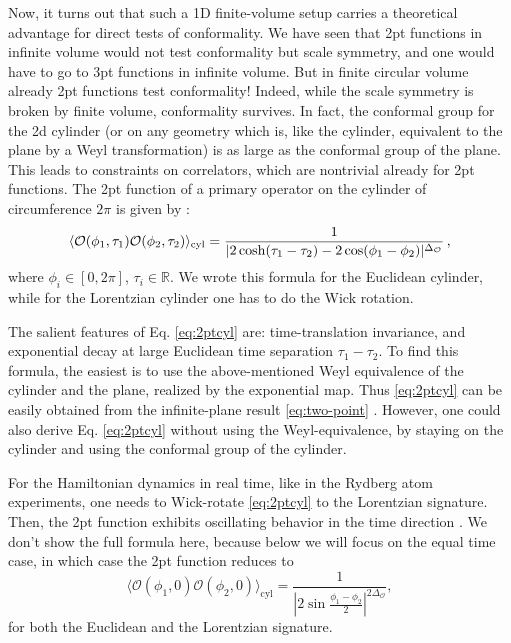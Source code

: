 \documentclass[a4paper,12pt]{article}
\theoremstyle{remark}
\theoremstyle{theorem}
\begin{document}
Now, it turns out that such a 1D finite-volume setup carries a theoretical
advantage for direct tests of conformality. We have seen that 2pt functions in
infinite volume would not test conformality but scale symmetry, and one would
have to go to 3pt functions in infinite volume. But in finite circular volume
already 2pt functions test conformality! Indeed, while the scale symmetry is
broken by finite volume, conformality survives. In fact, the conformal group for
the 2d cylinder (or on any geometry which is, like the cylinder, equivalent to
the plane by a Weyl transformation) is as large as the conformal group of the
plane. This leads to constraints on correlators, which are nontrivial already
for 2pt functions. The 2pt function of a primary operator on the cylinder of
circumference $2 \pi$ is given by {\cite{Luscher:1974ez}}:
\begin{equation}
	\label{eq:2ptcyl} \langle \mathcal{O}(\phi_1, \tau_1)\mathcal{O}(\phi_2,
	\tau_2) \rangle_{\text{cyl}} = \frac{1}{|2 \cosh
		(\tau_1 - \tau_2) - 2 \cos (\phi_1 - \phi_2) |^{\Delta_{\mathcal{O}}}}
	\hspace{0.17em},
\end{equation}
where $\phi_i \in [0, 2 \pi]$, $\tau_i \in \mathbb{R}$. We wrote this formula
for the Euclidean cylinder, while for the Lorentzian cylinder one has to do
the Wick rotation.

The salient features of Eq. \eqref{eq:2ptcyl} are: time-translation
invariance, and exponential decay at large Euclidean time separation $\tau_1 -
\tau_2$. To find this formula, the easiest is to use the above-mentioned Weyl
equivalence of the cylinder and the plane, realized by the exponential map.
Thus \eqref{eq:2ptcyl} can be easily obtained from the infinite-plane result
\eqref{eq:two-point} {\cite{DiFrancesco:1997nk}}. However, one
could also derive Eq. \eqref{eq:2ptcyl} without using the
Weyl-equivalence, by staying on the cylinder and using the conformal group of
the cylinder.

For the Hamiltonian dynamics in real time, like in the Rydberg atom
experiments, one needs to Wick-rotate \eqref{eq:2ptcyl} to the Lorentzian
signature. Then, the 2pt function exhibits oscillating behavior in the time
direction {\cite{Luscher:1974ez}}. We don't show the full formula here,
because below we will focus on the equal time case, in which case the 2pt
function reduces to
\begin{equation}
	\label{eq:2ptcylequal} \langle \mathcal{O}(\phi_1, 0)\mathcal{O}(\phi_2, 0)
	\rangle_{\text{cyl}} = \frac{1}{|2 \sin \frac{\phi_1 -
			\phi_2}{2} |^{2 \Delta_{\mathcal{O}}}},
\end{equation}
for both the Euclidean and the Lorentzian signature.
\end{document}
